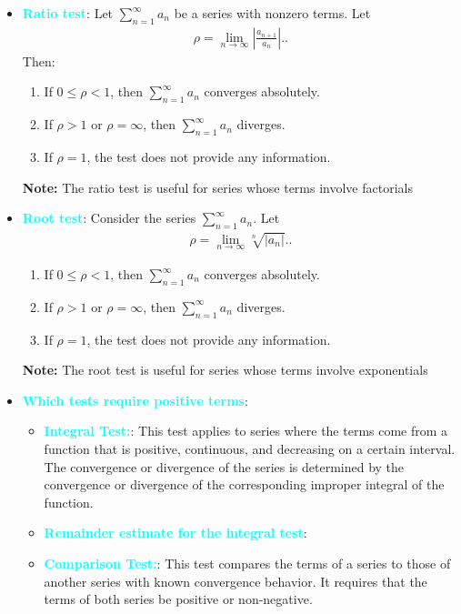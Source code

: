 \documentclass{report}
\begin{document}
\begin{itemize}
\item \textbf{\textcolor{cyan}{Ratio test}}:
    Let \(\sum_{n=1}^{\infty} a_n\) be a series with nonzero terms. Let
    \begin{align*}
        \rho = \lim_{n \to \infty} \left| \frac{a_{n+1}}{a_n} \right|.
    .\end{align*}
    Then:
    \begin{enumerate}[label=\roman*.]
        \item If \(0 \leq \rho < 1\), then \(\sum_{n=1}^{\infty} a_n\) converges absolutely.
        \item If \(\rho > 1\) or \(\rho = \infty\), then \(\sum_{n=1}^{\infty} a_n\) diverges.
        \item If \(\rho = 1\), the test does not provide any information.
    \end{enumerate}
    \bigbreak \noindent 
    \textbf{Note:} The ratio test is useful for series whose terms involve factorials
\item \textbf{\textcolor{cyan}{Root test}}:
    Consider the series \(\sum_{n=1}^{\infty} a_n\). Let
    \begin{align*}
        \rho = \lim_{n \to \infty} \sqrt[n]{|a_n|}.
    .\end{align*}
    \begin{enumerate}[label=\roman*.]
        \item If \(0 \leq \rho < 1\), then \(\sum_{n=1}^{\infty} a_n\) converges absolutely. 
        \item If \(\rho > 1\) or \(\rho = \infty\), then \(\sum_{n=1}^{\infty} a_n\) diverges. 
        \item If \(\rho = 1\), the test does not provide any information.
    \end{enumerate}
    \bigbreak \noindent 
    \textbf{Note:} The root test is useful for series whose terms involve exponentials
\item \textbf{\textcolor{cyan}{Which tests require positive terms}}:
    \begin{itemize}
        \item \textbf{\textcolor{cyan}{Integral Test:}}: This test applies to series where the terms come from a function that is positive, continuous, and decreasing on a certain interval. The convergence or divergence of the series is determined by the convergence or divergence of the corresponding improper integral of the function.
        \item \textbf{\textcolor{cyan}{Remainder estimate for the integral test}}:
        \item \textbf{\textcolor{cyan}{Comparison Test:}}: This test compares the terms of a series to those of another series with known convergence behavior. It requires that the terms of both series be positive or non-negative.

\end{itemize}
\end{itemize}
\end{document}
